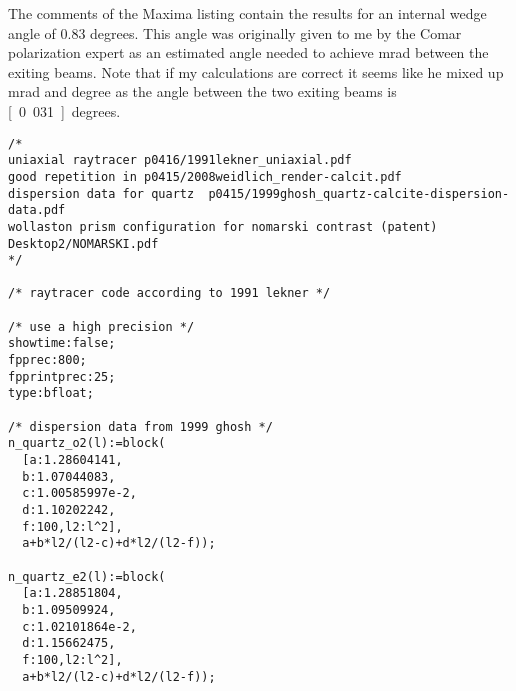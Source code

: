The comments of the Maxima listing contain the results for an internal
wedge angle of 0.83 degrees. This angle was originally given to me by
the Comar polarization expert as an estimated angle needed to achieve
\unit[32]{mrad} between the exiting beams. Note that if my
calculations are correct it seems like he mixed up mrad and degree as
the angle between the two exiting beams is \unit[0.031]{degrees}.

\begin{lstlisting}
/*
uniaxial raytracer p0416/1991lekner_uniaxial.pdf
good repetition in p0415/2008weidlich_render-calcit.pdf
dispersion data for quartz  p0415/1999ghosh_quartz-calcite-dispersion-data.pdf
wollaston prism configuration for nomarski contrast (patent) Desktop2/NOMARSKI.pdf
*/

/* raytracer code according to 1991 lekner */

/* use a high precision */
showtime:false;
fpprec:800;
fpprintprec:25;
type:bfloat;

/* dispersion data from 1999 ghosh */
n_quartz_o2(l):=block(
  [a:1.28604141,
  b:1.07044083,
  c:1.00585997e-2,
  d:1.10202242,
  f:100,l2:l^2],
  a+b*l2/(l2-c)+d*l2/(l2-f));

n_quartz_e2(l):=block(
  [a:1.28851804,
  b:1.09509924,
  c:1.02101864e-2,
  d:1.15662475,
  f:100,l2:l^2],
  a+b*l2/(l2-c)+d*l2/(l2-f));


\end{lstlisting}
